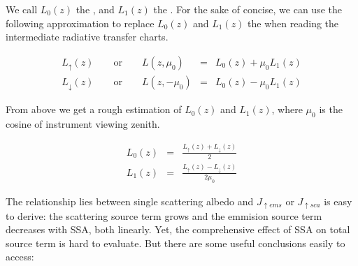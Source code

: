 We call $L_{0}(z)$ the , and $L_{1}(z)$ the .
For the sake of concise, we can use the following approximation to replace $L_{0}(z)$ and $L_{1}(z)$ the when reading the 
intermediate radiative transfer charts.

\begin{eqnarray} \label{eq:approxforLupLdo}
    L_{\uparrow}(z)   \qquad \textrm{or} \qquad L(z, \mu_{0})   & = & L_{0}(z) + \mu_{0}L_{1}(z) \nonumber\\
    L_{\downarrow}(z) \qquad \textrm{or} \qquad L(z, -\mu_{0})  & = & L_{0}(z) - \mu_{0}L_{1}(z)
\end{eqnarray}

From above we get a rough estimation of  $L_{0}(z)$ and $L_{1}(z)$, where $\mu_{0}$ is the cosine of instrument viewing zenith.

\begin{eqnarray} \label{eq:approxforL0L1}
    L_{0}(z)     & = & \frac{L_{\uparrow}(z) + L_{\downarrow}(z)}{2} \nonumber\\
    L_{1}(z)     & = & \frac{L_{\uparrow}(z) - L_{\downarrow}(z)}{2\mu_{0}}
\end{eqnarray}

The relationship lies between single scattering albedo and $J_{\uparrow ems}$ or $J_{\uparrow sca}$ is easy to derive:
the scattering source term grows and the emmision source term decreases with SSA, both linearly. Yet, the comprehensive
effect of SSA on total source term is hard to evaluate. But there are some useful conclusions easily to access:

